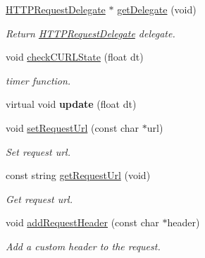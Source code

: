 \begin{DoxyCompactItemize}
\hyperlink{classHTTPRequestDelegate}{H\+T\+T\+P\+Request\+Delegate} $\ast$ \hyperlink{classHTTPRequest_a7616a455bd483617a4052f7304acbaa4}{get\+Delegate} (void)
\begin{DoxyCompactList}\small\item\em Return \hyperlink{classHTTPRequestDelegate}{H\+T\+T\+P\+Request\+Delegate} delegate. \end{DoxyCompactList}\item 
\mbox{\label{classHTTPRequest_a9c400b1c64eade8afa5f16feb5bd9eec}} 
void \hyperlink{classHTTPRequest_a9c400b1c64eade8afa5f16feb5bd9eec}{check\+C\+U\+R\+L\+State} (float dt)
\begin{DoxyCompactList}\small\item\em timer function. \end{DoxyCompactList}\item 
\mbox{\label{classHTTPRequest_a4338020fda2bb92e0de36414957b3001}} 
virtual void {\bfseries update} (float dt)
\item 
\mbox{\label{classHTTPRequest_ae90d5d1c70b5f9df46208ae34fc12e80}} 
void \hyperlink{classHTTPRequest_ae90d5d1c70b5f9df46208ae34fc12e80}{set\+Request\+Url} (const char $\ast$url)
\begin{DoxyCompactList}\small\item\em Set request url. \end{DoxyCompactList}\item 
\mbox{\label{classHTTPRequest_ae96c279487c9f38a868694e517f0e929}} 
const string \hyperlink{classHTTPRequest_ae96c279487c9f38a868694e517f0e929}{get\+Request\+Url} (void)
\begin{DoxyCompactList}\small\item\em Get request url. \end{DoxyCompactList}\item 
\mbox{\label{classHTTPRequest_af36065c9de6520eef7bc9e79d7333aac}} 
void \hyperlink{classHTTPRequest_af36065c9de6520eef7bc9e79d7333aac}{add\+Request\+Header} (const char $\ast$header)
\begin{DoxyCompactList}\small\item\em Add a custom header to the request. \end{DoxyCompactList}\item 

\end{DoxyCompactItemize}
